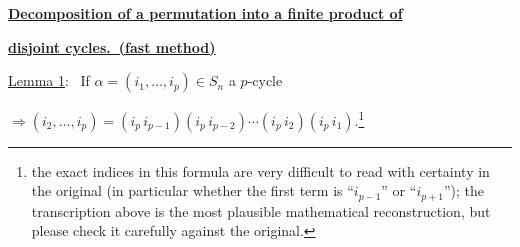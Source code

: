\documentclass[12pt]{article}
\begin{document}
\noindent\underline{\textbf{Decomposition of a permutation into a finite product of}}

\noindent\underline{\textbf{disjoint cycles.\ (fast method)}}

\bigskip
\bigskip
\noindent\underline{Lemma 1}: \ If $\alpha = (i_1,\ldots,i_p)\in S_n$ \quad a $p$-cycle

\bigskip
\noindent $\Rightarrow (i_2,\ldots,i_p) = (i_p\,i_{p-1})(i_p\,i_{p-2})\cdots(i_p\,i_2)(i_p\,i_1).$\footnote{the exact indices in this formula are very difficult to read with certainty in the original (in particular whether the first term is ``$i_{p-1}$'' or ``$i_{p+1}$''); the transcription above is the most plausible mathematical reconstruction, but please check it carefully against the original.}
\end{document}
